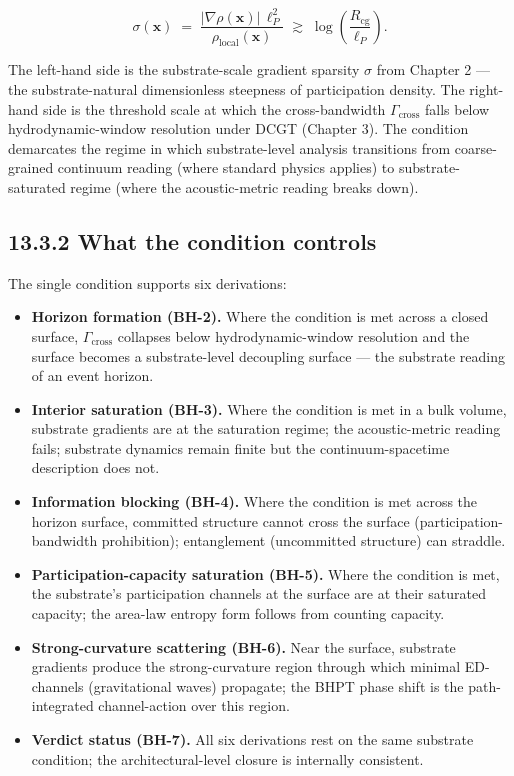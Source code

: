 \documentclass[11pt]{book}
\begin{document}
\[
\sigma(\mathbf{x}) \;=\; \frac{|\nabla\rho(\mathbf{x})|\,\ell_P^2}{\rho_\mathrm{local}(\mathbf{x})} \;\gtrsim\; \log\!\left(\frac{R_\mathrm{cg}}{\ell_P}\right).
\]

The left-hand side is the substrate-scale gradient sparsity $\sigma$ from Chapter 2 — the substrate-natural dimensionless steepness of participation density. The right-hand side is the threshold scale at which the cross-bandwidth $\Gamma_\mathrm{cross}$ falls below hydrodynamic-window resolution under DCGT (Chapter 3). The condition demarcates the regime in which substrate-level analysis transitions from coarse-grained continuum reading (where standard physics applies) to substrate-saturated regime (where the acoustic-metric reading breaks down).

\subsection{13.3.2 What the condition controls}

The single condition supports six derivations:

\begin{itemize}
\item \textbf{Horizon formation (BH-2).} Where the condition is met across a closed surface, $\Gamma_\mathrm{cross}$ collapses below hydrodynamic-window resolution and the surface becomes a substrate-level decoupling surface — the substrate reading of an event horizon.
\item \textbf{Interior saturation (BH-3).} Where the condition is met in a bulk volume, substrate gradients are at the saturation regime; the acoustic-metric reading fails; substrate dynamics remain finite but the continuum-spacetime description does not.
\item \textbf{Information blocking (BH-4).} Where the condition is met across the horizon surface, committed structure cannot cross the surface (participation-bandwidth prohibition); entanglement (uncommitted structure) can straddle.
\item \textbf{Participation-capacity saturation (BH-5).} Where the condition is met, the substrate's participation channels at the surface are at their saturated capacity; the area-law entropy form follows from counting capacity.
\item \textbf{Strong-curvature scattering (BH-6).} Near the surface, substrate gradients produce the strong-curvature region through which minimal ED-channels (gravitational waves) propagate; the BHPT phase shift is the path-integrated channel-action over this region.
\item \textbf{Verdict status (BH-7).} All six derivations rest on the same substrate condition; the architectural-level closure is internally consistent.
\end{itemize}
\end{document}
